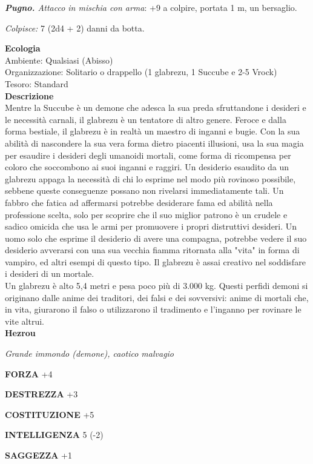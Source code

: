 \begin{multicols}{2}
\emph{\textbf{Pugno.} Attacco in mischia con arma}: +9 a colpire, portata 1 m, un bersaglio.

\emph{Colpisce:} 7 (2d4 + 2) danni da botta.

\textbf{Ecologia}\\
Ambiente: Qualsiasi (Abisso)\\
Organizzazione: Solitario o drappello (1 glabrezu, 1 Succube e 2-5 Vrock)\\
Tesoro: Standard\\
\textbf{Descrizione}\\
Mentre la Succube è un demone che adesca la sua preda sfruttandone i desideri e le necessità carnali, il glabrezu è un tentatore di altro genere. Feroce e dalla forma bestiale, il glabrezu è in realtà un maestro di inganni e bugie. Con la sua abilità di nascondere la sua vera forma dietro piacenti illusioni, usa la sua magia per esaudire i desideri degli umanoidi mortali, come forma di ricompensa per coloro che soccombono ai suoi inganni e raggiri. Un desiderio esaudito da un glabrezu appaga la necessità di chi lo esprime nel modo più rovinoso possibile, sebbene queste conseguenze possano non rivelarsi immediatamente tali. Un fabbro che fatica ad affermarsi potrebbe desiderare fama ed abilità nella professione scelta, solo per scoprire che il suo miglior patrono è un crudele e sadico omicida che usa le armi per promuovere i propri distruttivi desideri. Un uomo solo che esprime il desiderio di avere una compagna, potrebbe vedere il suo desiderio avverarsi con una sua vecchia fiamma ritornata alla "vita" in forma di vampiro, ed altri esempi di questo tipo. Il glabrezu è assai creativo nel soddisfare i desideri di un mortale.\\
Un glabrezu è alto 5,4 metri e pesa poco più di 3.000 kg. Questi perfidi demoni si originano dalle anime dei traditori, dei falsi e dei sovversivi: anime di mortali che, in vita, giurarono il falso o utilizzarono il tradimento e l'inganno per rovinare le vite altrui.\\


\medskip{}\textbf{Hezrou}

\emph{Grande immondo (demone), caotico malvagio}

\textbf{FORZA} +4

\textbf{DESTREZZA} +3

\textbf{COSTITUZIONE} +5

\textbf{INTELLIGENZA} 5 (-2)

\textbf{SAGGEZZA} +1


\end{multicols}
